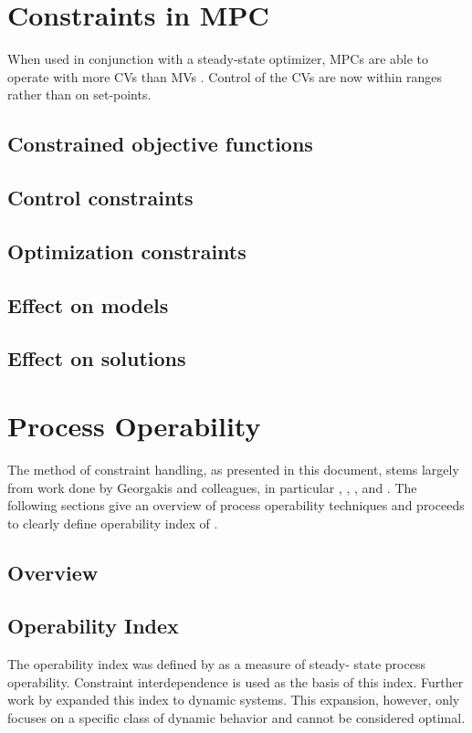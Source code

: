\section{Constraints in MPC}
When used in conjunction with a steady-state optimizer, MPCs are able to operate
with more CVs than MVs \citet{vinsonphd}. Control of the CVs are now within
ranges rather than on set-points.
\subsection{Constrained objective functions}\label{sec:conobjfn}
\subsection{Control constraints}
\subsection{Optimization constraints}

\subsection{Effect on models}
\subsection{Effect on solutions}

\section{Process Operability}
The method of constraint handling, as presented in this document, stems largely
from work done by Georgakis and colleagues, in particular \citet{vinsonphd},
\citet{vinsonartoi}, \citet{limaphd}, \citet{opconproc} and \citet{opidealrx}.
The following sections give an overview of process operability techniques
and proceeds to clearly define operability index of \citet{vinsonphd}.
\subsection{Overview}
\subsection{Operability Index}
The operability index was defined by \citet{vinsonphd} as a measure of steady-
state process operability. Constraint interdependence is used as the basis of
this index. Further work by \citet{limaphd} expanded this index to dynamic
systems. This expansion, however, only focuses on a specific class of dynamic
behavior and cannot be considered optimal.
